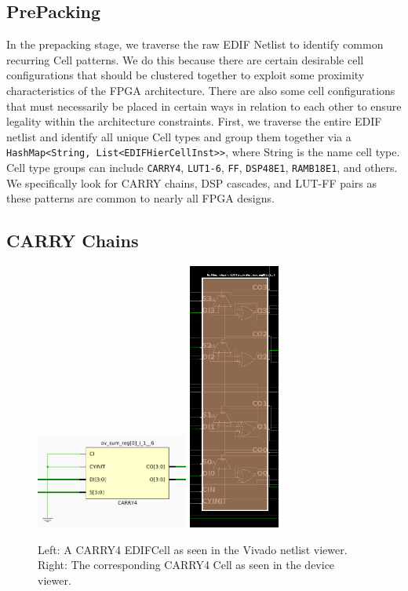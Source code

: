 \documentclass[twocolumn]{article}
\begin{document}
    \subsection{PrePacking}
        In the prepacking stage, we traverse the raw EDIF Netlist to identify common recurring Cell patterns. 
        We do this because there are certain desirable cell configurations that should be clustered together to exploit some proximity characteristics of the FPGA architecture. 
        There are also some cell configurations that must necessarily be placed in certain ways in relation to each other to ensure legality within the architecture constraints. 
        First, we traverse the entire EDIF netlist and identify all unique Cell types and group them together via a {\tt HashMap<String, List<EDIFHierCellInst>>}, where String is the name cell type. 
        Cell type groups can include {\tt CARRY4}, {\tt LUT1-6}, {\tt FF}, {\tt DSP48E1}, {\tt RAMB18E1}, and others. 
        We specifically look for CARRY chains, DSP cascades, and LUT-FF pairs as these patterns are common to nearly all FPGA designs.

        \subsection{CARRY Chains}
            \begin{figure}[]
                \centering
                \includegraphics[width=5.0cm]{figures/carry_cell_edif.png}
                \includegraphics[width=3.0cm]{figures/carry_cell_device.png}
                \caption{
                    Left: A CARRY4 EDIFCell as seen in the Vivado netlist viewer.
                    Right: The corresponding CARRY4 Cell as seen in the device viewer.
                }
                \label{fig:carry_cell_edif}
            \end{figure}
\end{document}
